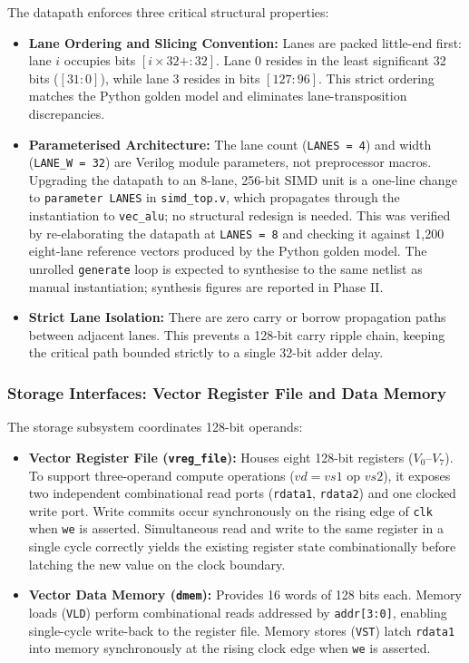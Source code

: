 The datapath enforces three critical structural properties:
\begin{itemize}
  \item \textbf{Lane Ordering and Slicing Convention:} Lanes are packed little-end first: lane $i$ occupies bits $[i \times 32 +: 32]$. Lane 0 resides in the least significant 32 bits ($[31:0]$), while lane 3 resides in bits $[127:96]$. This strict ordering matches the Python golden model and eliminates lane-transposition discrepancies.
  \item \textbf{Parameterised Architecture:} The lane count (\texttt{LANES = 4}) and width (\texttt{LANE\_W = 32}) are Verilog module parameters, not preprocessor macros. Upgrading the datapath to an 8-lane, 256-bit SIMD unit is a one-line change to \texttt{parameter LANES} in \texttt{simd\_top.v}, which propagates through the instantiation to \texttt{vec\_alu}; no structural redesign is needed. This was verified by re-elaborating the datapath at \texttt{LANES = 8} and checking it against 1{,}200 eight-lane reference vectors produced by the Python golden model. The unrolled \texttt{generate} loop is expected to synthesise to the same netlist as manual instantiation; synthesis figures are reported in Phase II.
  \item \textbf{Strict Lane Isolation:} There are zero carry or borrow propagation paths between adjacent lanes. This prevents a 128-bit carry ripple chain, keeping the critical path bounded strictly to a single 32-bit adder delay.
\end{itemize}

\subsubsection{Storage Interfaces: Vector Register File and Data Memory}
The storage subsystem coordinates 128-bit operands:
\begin{itemize}
  \item \textbf{Vector Register File (\texttt{vreg\_file}):} Houses eight 128-bit registers ($V_0$--$V_7$). To support three-operand compute operations ($vd = vs1 \text{ op } vs2$), it exposes two independent combinational read ports (\texttt{rdata1}, \texttt{rdata2}) and one clocked write port. Write commits occur synchronously on the rising edge of \texttt{clk} when \texttt{we} is asserted. Simultaneous read and write to the same register in a single cycle correctly yields the existing register state combinationally before latching the new value on the clock boundary.
  \item \textbf{Vector Data Memory (\texttt{dmem}):} Provides 16 words of 128 bits each. Memory loads (\texttt{VLD}) perform combinational reads addressed by \texttt{addr[3:0]}, enabling single-cycle write-back to the register file. Memory stores (\texttt{VST}) latch \texttt{rdata1} into memory synchronously at the rising clock edge when \texttt{we} is asserted.
\end{itemize}

